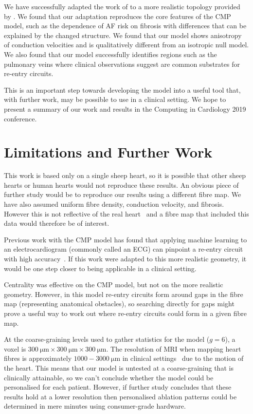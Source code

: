 We have successfully adapted the work of  to a more realistic topology provided by . We found that our adaptation reproduces the core features of the CMP model, such as the dependence of AF risk on fibrosis with differences that can be explained by the changed structure. We found that our model shows anisotropy of conduction velocities and is qualitatively different from an isotropic null model. We also found that our model successfully identifies regions such as the pulmonary veins where clinical observations suggest are common substrates for re-entry circuits.

This is an important step towards developing the \cmp model into a useful tool that, with further work, may be possible to use in a clinical setting. We hope to present a summary of our work and results in the Computing in Cardiology 2019 conference.


\section{Limitations and Further Work}

This work is based only on a single sheep heart, so it is possible that other sheep hearts or human hearts would not reproduce these results. An obvious piece of further study would be to reproduce our results using a different fibre map.
We have also assumed uniform fibre density, conduction velocity, and fibrosis. However this is not reflective of the real heart~\cite{alonso2016nonlinear} and a fibre map that included this data would therefore be of interest.

Previous work with the CMP model has found that applying machine learning to an electrocardiogram (commonly called an ECG) can pinpoint a re-entry circuit with high accuracy~\cite{mcgillivray2018machine}. If this work were adapted to this more realistic geometry, it would be one step closer to being applicable in a clinical setting.

Centrality was effective on the CMP model, but not on the more realistic geometry. However, in this model re-entry circuits form around gaps in the fibre map (representing anatomical obstacles), so searching directly for gaps might prove a useful way to work out where re-entry circuits could form in a given fibre map.

At the coarse-graining levels used to gather statistics for the model ($g=6$), a voxel is $300~\mathrm{\mu m} \times 300~\mathrm{\mu m} \times 300~\mathrm{\mu m}$. The resolution of MRI when mapping heart fibres is approximately $1000 - 3000~\mathrm{\mu m}$ in clinical settings~\cite{mori2006principles} due to the motion of the heart. This means that our model is untested at a coarse-graining that is clinically attainable, so we can't conclude whether the model could be personalised for each patient. However, if further study concludes that these results hold at a lower resolution then personalised ablation patterns could be determined in mere minutes using consumer-grade hardware.


